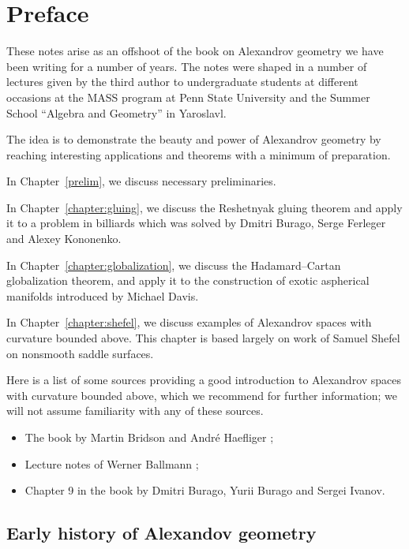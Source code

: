 \mainmatter

\chapter*{Preface}

These notes arise as an offshoot 
of the book on Alexandrov geometry we have been writing for  a number of years.
The notes were shaped in a number of lectures given by the third author
to undergraduate students 
at different  occasions at the
MASS program at Penn State University
and the Summer School ``Algebra and Geometry'' in Yaroslavl.

The idea is to demonstrate the beauty and power of Alexandrov geometry by reaching interesting applications and theorems with a minimum of preparation.

\medskip 

In Chapter~\ref{prelim}, we discuss necessary preliminaries.

In Chapter~\ref{chapter:gluing}, we discuss the Reshetnyak gluing theorem and apply it to a problem in billiards which was solved by Dmitri Burago, Serge Ferleger and Alexey Kononenko.

In Chapter~\ref{chapter:globalization}, we discuss the Hadamard--Cartan globalization theorem, and apply it to the construction of exotic aspherical manifolds introduced by Michael Davis.

In Chapter~\ref{chapter:shefel}, we discuss examples of Alexandrov spaces with curvature bounded above.
This chapter is based largely on work of Samuel Shefel on nonsmooth saddle surfaces.

\medskip

Here is a list of some sources providing a good introduction to Alexandrov spaces with curvature bounded above, which we recommend for further information;
we will not assume familiarity with any of these sources.

\begin{itemize}
\item The book by Martin Bridson and Andr\'e Haefliger \cite{BH};
\item Lecture notes of Werner Ballmann \cite{ballmann:lectures};
\item Chapter 9 in the book \cite{BBI} by Dmitri Burago, Yurii Burago and Sergei Ivanov.
\end{itemize}



\section*{Early history of Alexandov geometry}

